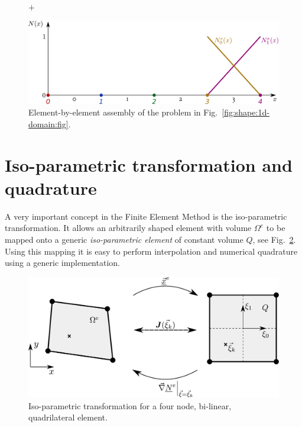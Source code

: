 \documentclass[times,namecite]{goose-article}
\begin{document}
\begin{figure}[htp]
\begin{minipage}[t]{.5\textwidth}
  \end{minipage}
  \\
  $+$
  \\
  \begin{minipage}[t]{.5\textwidth}
    \centering
    \includegraphics[width=1.\textwidth]{figures/shape-functions-1d-element-3.pdf}
  \end{minipage}
  \caption{Element-by-element assembly of the problem in Fig.~\ref{fig:shape:1d-domain:fig}.}
  \label{fig:shape:1d-domain:assembly}
\end{figure}

\section{Iso-parametric transformation and quadrature}

A very important concept in the Finite Element Method is the iso-parametric transformation. It allows an arbitrarily shaped element with volume $\Omega^e$ to be mapped onto a generic \emph{iso-parametric element} of constant volume $Q$, see Fig.~\ref{fig:isoparametric}. Using this mapping it is easy to perform interpolation and numerical quadrature using a generic implementation.

\begin{figure}[htp]
  \centering
  \includegraphics[width=.5\textwidth]{figures/isoparametric-transform.pdf}
  \caption{Iso-parametric transformation for a four node, bi-linear, quadrilateral element.}
  \label{fig:isoparametric}
\end{figure}
\end{document}
